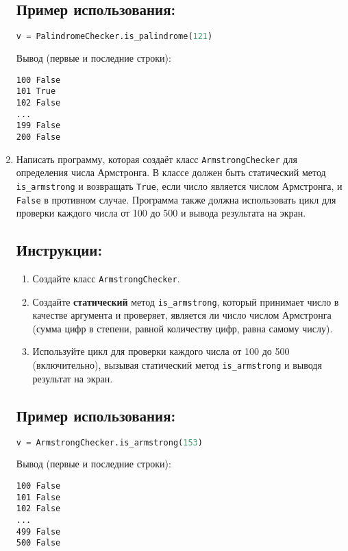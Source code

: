 \begin{enumerate}
\subsection*{Пример использования:}
\begin{lstlisting}[language=Python]
    v = PalindromeChecker.is_palindrome(121)
\end{lstlisting}
Вывод (первые и последние строки):
\begin{verbatim}
100 False
101 True
102 False
...
199 False
200 False
\end{verbatim}

\item
Написать программу, которая создаёт класс \texttt{ArmstrongChecker} 
для определения числа Армстронга. В классе должен быть статический метод
\texttt{is\_armstrong} и возвращать \texttt{True}, если число является числом Армстронга, 
и \texttt{False} в противном случае. 
Программа также должна использовать цикл для проверки каждого числа от 
100 до 500 и вывода результата на экран.

\subsection*{Инструкции:}
\begin{enumerate}
    \item Создайте класс \texttt{ArmstrongChecker}.
    \item Создайте \textbf{статический} метод \texttt{is\_armstrong}, который принимает число в качестве аргумента и проверяет, является ли число числом Армстронга (сумма цифр в степени, равной количеству цифр, равна самому числу).
    \item Используйте цикл для проверки каждого числа от 100 до 500 (включительно), вызывая статический метод \texttt{is\_armstrong} и выводя результат на экран.
\end{enumerate}

\subsection*{Пример использования:}
\begin{lstlisting}[language=Python]
    v = ArmstrongChecker.is_armstrong(153)
\end{lstlisting}
Вывод (первые и последние строки):
\begin{verbatim}
100 False
101 False
102 False
...
499 False
500 False
\end{verbatim}


\end{enumerate}
